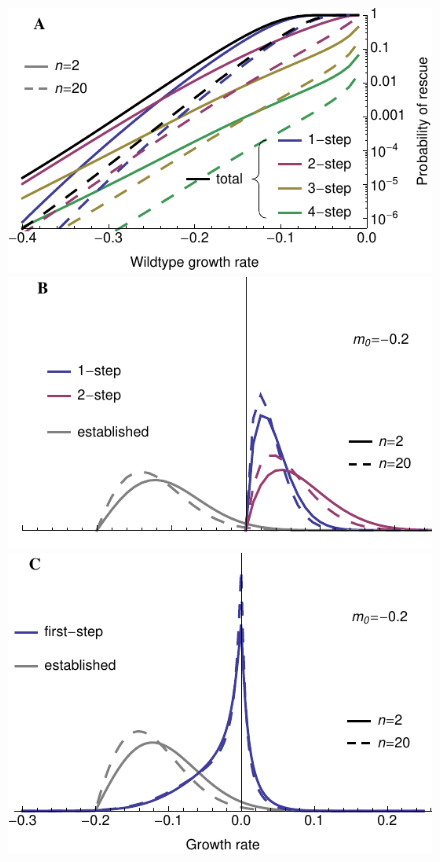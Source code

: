 \documentclass[9pt,twocolumn,twoside,lineno]{gsajnl}
\begin{document}
\begin{figure}[htbp]
\centering
\includegraphics[width=\linewidth]{prob_diffn.pdf}\\
\includegraphics[width=\linewidth]{dfe_diffn.pdf}\\
\includegraphics[width=\linewidth]{dfe_int_diffn.pdf}\\

\end{figure}
\end{document}
